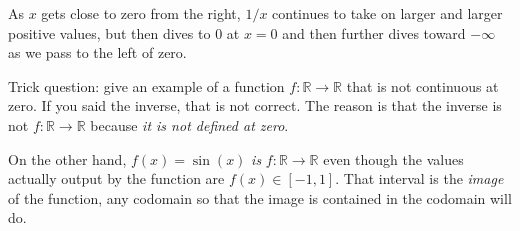 \documentclass[11pt, oneside]{article}
\begin{document}
As $x$ gets close to zero from the right, $1/x$ continues to take on larger and larger positive values, but then dives to $0$ at $x=0$ and then further dives toward $-\infty$ as we pass to the left of zero.

Trick question:  give an example of a function $f : \mathbb{R} \rightarrow \mathbb{R}$ that is not continuous at zero.  If you said the inverse, that is not correct.  The reason is that the inverse is not $f : \mathbb{R} \rightarrow \mathbb{R}$ because \emph{it is not defined at zero}.

On the other hand, $f(x) = \sin(x)$ \emph{is} $f : \mathbb{R} \rightarrow \mathbb{R}$ even though the values actually output by the function are $f(x) \in [-1,1]$.  That interval is the \emph{image} of the function, any codomain so that the image is contained in the codomain will do.
\end{document}
